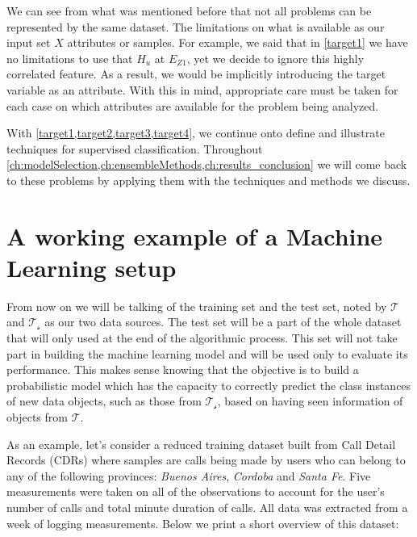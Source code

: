 


We can see from what was mentioned before that not all problems can be represented by the same dataset.
The limitations on what is available as our input set $X$ attributes or samples. For example, we said that in \cref{target1} we have no limitations to use that $H_u$ at $E_{Z1}$, yet we decide to ignore this highly correlated feature. As a result, we  would be implicitly introducing the target variable as an attribute.
With this in mind, appropriate care must be taken for each case on which attributes are available for the problem being analyzed.


With \cref{target1,target2,target3,target4}, we continue onto define and illustrate techniques for supervised classification. Throughout \cref{ch:modelSelection,ch:ensembleMethods,ch:results_conclusion} we will come back to these problems by applying them with the techniques and methods we discuss.


\section{A working example of a Machine Learning setup}\label{section-example}

From now on we will be talking of the training set and the test set, noted by $\mathcal{T}$  and $\mathcal{T_s}$ as our two data sources. The test set will be a part of the whole dataset that will only used at the end of the algorithmic process. This set will not take part in building the machine learning model and will be used only to evaluate its performance. This makes sense knowing that the objective is to build a probabilistic model which has the capacity to correctly predict the class instances of new data objects, such as those from $\mathcal{T_s}$, based on having seen information of objects from $\mathcal{T}$.

As an example, let's consider a reduced training dataset built from Call Detail Records (CDRs) where samples are calls being made by users who can belong to any of the following provinces: \textit{Buenos Aires}, \textit{Cordoba} and \textit{Santa Fe}.
Five measurements were taken on all of the observations to account for the user's number of calls and total minute duration of calls. All data was extracted from a week of logging measurements. Below we print a short overview of this dataset:


